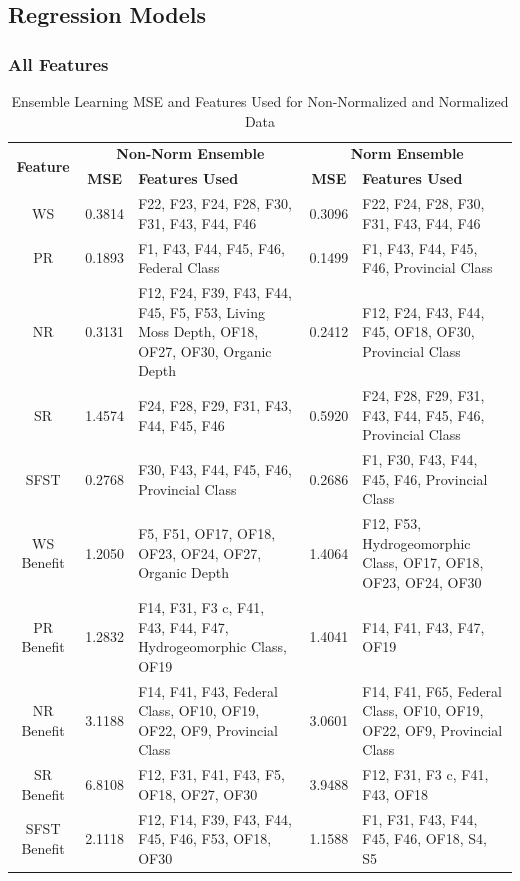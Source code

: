 \documentclass[12pt,letterpaper]{article}
\begin{document}
\clearpage
\subsection{Regression Models}\label{sec:reg}
\subsubsection{All Features}
\begin{table}
\centering
\begin{tabular}{|c||c|p{4cm}||c|p{4cm}|}
\hline
\multirow{2}{*}{\textbf{Feature}} & \multicolumn{2}{c||}{\textbf{Non-Norm Ensemble}} & \multicolumn{2}{c|}{\textbf{Norm Ensemble}} \\
\cline{2-5}
 & \textbf{MSE} & \textbf{Features Used} & \textbf{MSE} & \textbf{Features Used} \\
\hline
WS & 0.3814 & F22, F23, F24, F28, F30, F31, F43, F44, F46 & 0.3096 & F22, F24, F28, F30, F31, F43, F44, F46 \\
\hline
PR & 0.1893 & F1, F43, F44, F45, F46, Federal Class & 0.1499 & F1, F43, F44, F45, F46, Provincial Class \\
\hline
NR & 0.3131 & F12, F24, F39, F43, F44, F45, F5, F53, Living Moss Depth, OF18, OF27, OF30, Organic Depth & 0.2412 & F12, F24, F43, F44, F45, OF18, OF30, Provincial Class \\
\hline
SR & 1.4574 & F24, F28, F29, F31, F43, F44, F45, F46 & 0.5920 & F24, F28, F29, F31, F43, F44, F45, F46, Provincial Class \\
\hline
SFST & 0.2768 & F30, F43, F44, F45, F46, Provincial Class & 0.2686 & F1, F30, F43, F44, F45, F46, Provincial Class \\
\hline
WS Benefit & 1.2050 & F5, F51, OF17, OF18, OF23, OF24, OF27, Organic Depth & 1.4064 & F12, F53, Hydrogeomorphic Class, OF17, OF18, OF23, OF24, OF30 \\
\hline
PR Benefit & 1.2832 & F14, F31, F3 c, F41, F43, F44, F47, Hydrogeomorphic Class, OF19 & 1.4041 & F14, F41, F43, F47, OF19 \\
\hline
NR Benefit & 3.1188 & F14, F41, F43, Federal Class, OF10, OF19, OF22, OF9, Provincial Class & 3.0601 & F14, F41, F65, Federal Class, OF10, OF19, OF22, OF9, Provincial Class \\
\hline
SR Benefit & 6.8108 & F12, F31, F41, F43, F5, OF18, OF27, OF30 & 3.9488 & F12, F31, F3 c, F41, F43, OF18 \\
\hline
SFST Benefit & 2.1118 & F12, F14, F39, F43, F44, F45, F46, F53, OF18, OF30 & 1.1588 & F1, F31, F43, F44, F45, F46, OF18, S4, S5 \\
\hline
\end{tabular}
\caption{Ensemble Learning MSE and Features Used for Non-Normalized and Normalized Data}
\label{reg_all_tab:summary_mse_features}
\end{table}
%
%
%
%
%
\end{document}
